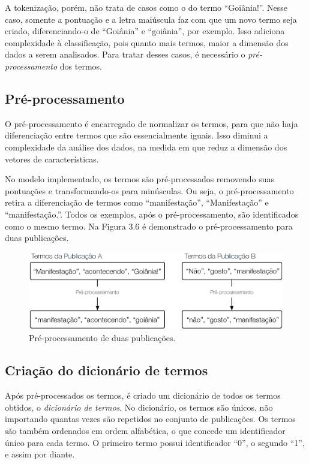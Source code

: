 A tokenização, porém, não trata de casos como o do termo ``Goiânia!''. Nesse caso, somente a pontuação e a letra maiúscula faz com que um novo termo seja criado, diferenciando-o de ``Goiânia'' e ``goiânia'', por exemplo. Isso adiciona complexidade à classificação, pois quanto mais termos, maior a dimensão dos dados a serem analisados. Para tratar desses casos, é necessário o \textit{pré-processamento} dos termos.

\subsection{Pré-processamento}

O pré-processamento é encarregado de normalizar os termos, para que não haja diferenciação entre termos que são essencialmente iguais. Isso diminui a complexidade da análise dos dados, na medida em que reduz a dimensão dos vetores de características.

No modelo implementado, os termos são pré-processados removendo suas pontuações e transformando-os para minúsculas. Ou seja, o pré-processamento retira a diferenciação de termos como ``manifestação'', ``Manifestação'' e ``manifestação.''. Todos os exemplos, após o pré-processamento, são identificados como o mesmo termo. Na Figura 3.6 é demonstrado o pré-processamento para duas publicações.

\begin{figure}[htpb]
	\begin{center}
		\includegraphics[width=1.0\textwidth]{figuras/pre-processamento.eps}
		\caption{Pré-processamento de duas publicações.}
	\end{center}
\end{figure}

\subsection{Criação do dicionário de termos}

Após pré-processados os termos, é criado um dicionário de todos os termos obtidos, o \textit{dicionário de termos}. No dicionário, os termos são únicos, não importando quantas vezes são repetidos no conjunto de publicações. Os termos são também ordenados em ordem alfabética, o que concede um identificador único para cada termo. O primeiro termo possui identificador ``0'', o segundo ``1'', e assim por diante.

